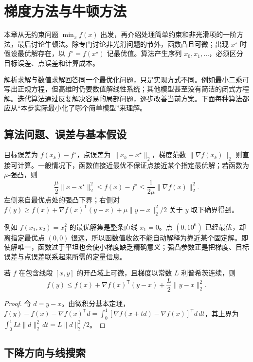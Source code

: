 \documentclass[UTF8,12pt,a4paper,fontset=fandol]{ctexbook}
\begin{document}
\chapter{梯度方法与牛顿方法}
\label{ch:co-unconstrained}

本章从无约束问题 $\min_x f(x)$ 出发，再介绍处理简单约束和非光滑项的一阶方法，最后讨论牛顿法。除专门讨论非光滑问题的节外，函数凸且可微；出现 $x^\star$ 时假设最优解存在，以 $f^\star=f(x^\star)$ 记最优值。算法产生序列 $x_0,x_1,\ldots$，必须区分目标误差、点误差和计算成本。

解析求解与数值求解回答同一个最优化问题，只是实现方式不同。例如最小二乘可写出正规方程，但高维时仍要数值解线性系统；其他模型甚至没有简洁的闭式方程解。迭代算法通过反复解决容易的局部问题，逐步改善当前方案。下面每种算法都应从“本步实际最小化了哪个简单模型”来理解。

\section{算法问题、误差与基本假设}

目标误差为 $f(x_k)-f^\star$，点误差为 $\|x_k-x^\star\|_2$，梯度范数 $\|\nabla f(x_k)\|_2$ 则直接可计算。一般情况下，函数值接近最优不保证点接近某个指定最优解；若函数为 $\mu$-强凸，则
\[
 \frac\mu2\|x-x^\star\|_2^2\leq f(x)-f^\star
 \leq\frac1{2\mu}\|\nabla f(x)\|_2^2.
\]
左侧来自最优点处的强凸下界；右侧对 $f(y)\geq f(x)+\nabla f(x)^{\mathsf T}(y-x)+\mu\|y-x\|_2^2/2$ 关于 $y$ 取下确界得到。

例如 $f(x_1,x_2)=x_1^2$ 的最优解集是整条直线 $x_1=0$。点 $(0,10^6)$ 已经最优，却离指定最优点 $(0,0)$ 很远，所以函数值收敛不能自动解释为靠近某个固定解。即使解唯一，函数过于平坦也会使小梯度缺乏精确意义；强凸参数正是把梯度、目标误差与点误差联系起来所需的定量信息。

\begin{lemma}[下降引理]
若 $f$ 在包含线段 $[x,y]$ 的开凸域上可微，且梯度以常数 $L$ 利普希茨连续，则
\begin{equation}
 f(y)\leq f(x)+\nabla f(x)^{\mathsf T}(y-x)+\frac L2\|y-x\|_2^2.
 \label{eq:co-descent-lemma}
\end{equation}
\end{lemma}
\begin{proof}
令 $d=y-x$。由微积分基本定理，$f(y)-f(x)-\nabla f(x)^{\mathsf T}d=\int_0^1[\nabla f(x+td)-\nabla f(x)]^{\mathsf T}d\,dt$，其上界为 $\int_0^1Lt\|d\|_2^2\,dt=L\|d\|_2^2/2$。
\end{proof}

\section{下降方向与线搜索}
\end{document}
